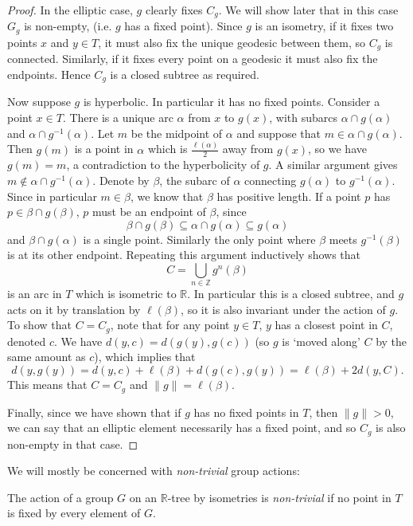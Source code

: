 \begin{proof}
    In the elliptic case, $g$ clearly fixes $C_g$. We will show later that in this case $G_g$ is non-empty, (i.e. $g$ has a fixed point). Since $g$ is an isometry, if it fixes two points $x$ and $y\in T$, it must also fix the unique geodesic between them, so $C_g$ is connected. Similarly, if it fixes every point on a geodesic it must also fix the endpoints. Hence $C_g$ is a closed subtree as required.

    Now suppose $g$ is hyperbolic. In particular it has no fixed points. Consider a point $x\in T$. There is a unique arc $\alpha$ from $x$ to $g(x)$, with subarcs $\alpha \cap g(\alpha)$ and $\alpha \cap g^{-1}(\alpha)$. Let $m$ be the midpoint of $\alpha$ and suppose that $m\in \alpha \cap g(\alpha)$. Then $g(m)$ is a point in $\alpha$ which is $\frac{\ell(\alpha)}{2}$ away from $g(x)$, so we have $g(m)=m$, a contradiction to the hyperbolicity of $g$. A similar argument gives $m\notin \alpha \cap g^{-1}(\alpha)$. Denote by $\beta$, the subarc of $\alpha$ connecting $g(\alpha)$ to $g^{-1}(\alpha)$. Since in particular $m\in \beta$, we know that $\beta$ has positive length. If a point $p$ has $p\in \beta \cap g(\beta)$, $p$ must be an endpoint of $\beta$, since \[\beta\cap g(\beta)\subseteq\alpha\cap g(\alpha)\subseteq g(\alpha)\] and $\beta\cap g(\alpha)$ is a single point. Similarly the only point where $\beta$ meets $g^{-1}(\beta)$ is at its other endpoint. Repeating this argument inductively shows that \[C=\underset{n\in\mathbb{Z}}{\bigcup}g^n(\beta)\] is an arc in $T$ which is isometric to $\mathbb{R}$. In particular this is a closed subtree, and $g$ acts on it by translation by $\ell(\beta)$, so it is also invariant under the action of $g$. To show that $C=C_g$, note that for any point $y\in T$, $y$ has a closest point in $C$, denoted $c$. We have $d(y,c)=d(g(y),g(c))$ (so $g$ is `moved along'  $C$ by the same amount as $c$), which implies that \[d(y,g(y))=d(y,c)+\ell(\beta)+d(g(c),g(y))=\ell(\beta)+2d(y,C).\] This means that $C=C_g$ and $\lVert g\rVert=\ell(\beta)$.

    Finally, since we have shown that if $g$ has no fixed points in $T$, then $\lVert g\rVert>0$, we can say that an elliptic element necessarily has a fixed point, and so $C_g$ is also non-empty in that case.
\end{proof}

We will mostly be concerned with \textit{non-trivial} group actions:
\begin{definition}
    The action of a group $G$ on an $\mathbb{R}$-tree by isometries is \emph{non-trivial} if no point in $T$ is fixed by every element of $G$.
\end{definition}

